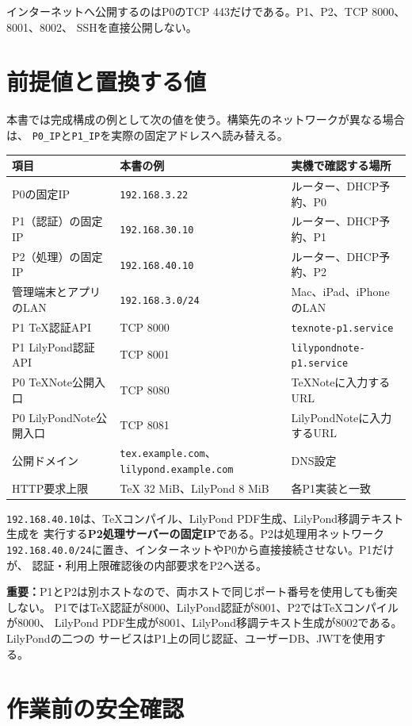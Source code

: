 \documentclass[uplatex,a4paper,11pt]{jsarticle}
\begin{document}
インターネットへ公開するのはP0のTCP 443だけである。P1、P2、TCP 8000、8001、8002、
SSHを直接公開しない。

\section{前提値と置換する値}

本書では完成構成の例として次の値を使う。構築先のネットワークが異なる場合は、
\texttt{P0\_IP}と\texttt{P1\_IP}を実際の固定アドレスへ読み替える。

\begin{longtable}{@{}p{52mm}p{48mm}p{48mm}@{}}
\toprule
項目 & 本書の例 & 実機で確認する場所\\
\midrule
P0の固定IP & \texttt{192.168.3.22} & ルーター、DHCP予約、P0\\
P1（認証）の固定IP & \texttt{192.168.30.10} & ルーター、DHCP予約、P1\\
P2（処理）の固定IP & \texttt{192.168.40.10} & ルーター、DHCP予約、P2\\
管理端末とアプリのLAN & \texttt{192.168.3.0/24} & Mac、iPad、iPhoneのLAN\\
P1 TeX認証API & TCP 8000 & \texttt{texnote-p1.service}\\
P1 LilyPond認証API & TCP 8001 & \texttt{lilypondnote-p1.service}\\
P0 TeXNote公開入口 & TCP 8080 & TeXNoteに入力するURL\\
P0 LilyPondNote公開入口 & TCP 8081 & LilyPondNoteに入力するURL\\
公開ドメイン & \texttt{tex.example.com}、\texttt{lilypond.example.com} & DNS設定\\
HTTP要求上限 & TeX 32 MiB、LilyPond 8 MiB & 各P1実装と一致\\
\bottomrule
\end{longtable}

\texttt{192.168.40.10}は、TeXコンパイル、LilyPond PDF生成、LilyPond移調テキスト生成を
実行する\textbf{P2処理サーバーの固定IP}である。P2は処理用ネットワーク
\texttt{192.168.40.0/24}に置き、インターネットやP0から直接接続させない。P1だけが、
認証・利用上限確認後の内部要求をP2へ送る。

\textbf{重要：}P1とP2は別ホストなので、両ホストで同じポート番号を使用しても衝突しない。
P1ではTeX認証が8000、LilyPond認証が8001、P2ではTeXコンパイルが8000、
LilyPond PDF生成が8001、LilyPond移調テキスト生成が8002である。LilyPondの二つの
サービスはP1上の同じ認証、ユーザーDB、JWTを使用する。

\section{作業前の安全確認}
\end{document}
